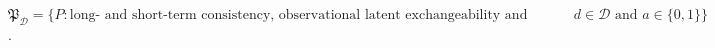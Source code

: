 \(\mathfrak P_{\mathcal D}=\{P: \text{long- and short-term consistency, observational latent exchangeability and overlap, experimental randomization and overlap, designwise full-short-term external validity and source support hold, and the sequential restriction, both completeness conditions, selection-bridge existence, operator bijectivity, and nondegenerate score variances hold for every }d\in\mathcal D\text{ and }a\in\{0,1\}\}\).